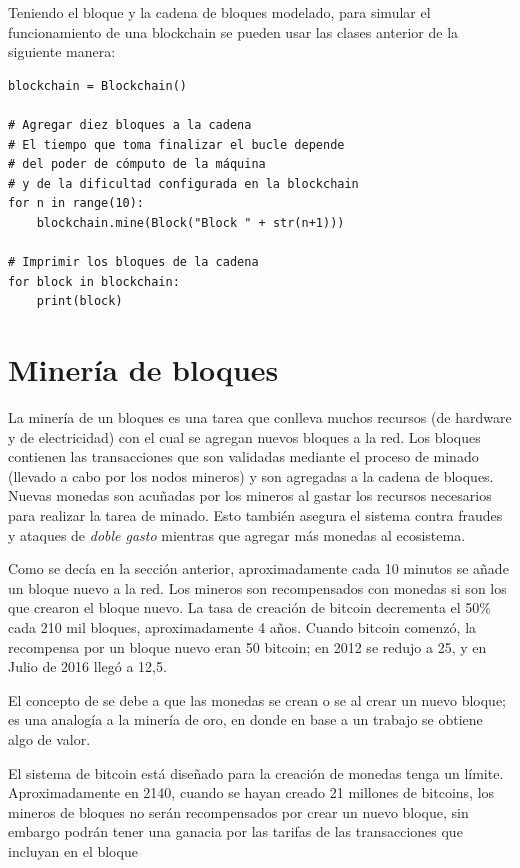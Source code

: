 Teniendo el bloque y la cadena de bloques modelado, para simular el funcionamiento de una blockchain se pueden usar las clases anterior de la siguiente manera:

\begin{lstlisting}
blockchain = Blockchain()

# Agregar diez bloques a la cadena
# El tiempo que toma finalizar el bucle depende 
# del poder de cómputo de la máquina 
# y de la dificultad configurada en la blockchain
for n in range(10):
    blockchain.mine(Block("Block " + str(n+1)))

# Imprimir los bloques de la cadena
for block in blockchain:
    print(block)

\end{lstlisting}

\section{Minería de bloques}

La minería de un bloques es una tarea que conlleva muchos recursos (de hardware y de electricidad) con el cual se agregan nuevos bloques a la red. Los bloques contienen las transacciones que son validadas mediante el proceso de minado (llevado a cabo por los nodos mineros) y son agregadas a la cadena de bloques. Nuevas monedas son acuñadas por los mineros al gastar los recursos necesarios para realizar la tarea de minado. Esto también asegura el sistema contra fraudes y ataques de \emph{doble gasto} mientras que agregar más monedas al ecosistema.

Como se decía en la sección anterior, aproximadamente cada 10 minutos se añade un bloque nuevo a la red. Los mineros son recompensados con monedas si son los que crearon el bloque nuevo. La tasa de creación de bitcoin decrementa el 50\% cada 210 mil bloques, aproximadamente 4 años. Cuando bitcoin comenzó, la recompensa por un bloque nuevo eran 50 bitcoin; en 2012 se redujo a 25, y en Julio de 2016 llegó a 12,5.

El concepto de  se debe a que las monedas se crean o se  al crear un nuevo bloque; es una analogía a la minería de oro, en donde en base a un trabajo se obtiene algo de valor.

El sistema de bitcoin está diseñado para la creación de monedas tenga un límite. Aproximadamente en 2140, cuando se hayan creado 21 millones de bitcoins, los mineros de bloques 
no serán recompensados por crear un nuevo bloque, sin embargo podrán tener una ganacia por las tarifas de las transacciones que incluyan en el bloque \autocite{MasteringBlockchainMining}


